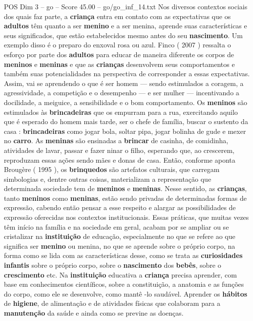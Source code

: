\begin{textsample}{POS Dim 3 – go – Score 45.00 – go/go\_inf\_14.txt}
Nos diversos contextos sociais dos quais faz parte, a \textbf{criança} entra em contato com as expectativas que os \textbf{adultos} têm quanto a ser \textbf{menino} e a ser menina, aprende suas características e seus significados, que estão estabelecidos mesmo antes do seu \textbf{nascimento}.
Um exemplo disso é o preparo do enxoval rosa ou azul.
Finco ( 2007 ) ressalta o esforço por parte dos \textbf{adultos} para educar de maneira diferente os corpos de \textbf{meninos} e \textbf{meninas} e que as \textbf{crianças} desenvolvem seus comportamentos e também suas potencialidades na perspectiva de corresponder a essas expectativas.
Assim, vai se aprendendo o que é ser homem — sendo estimulados a coragem, a agressividade, a competição e o desempenho — e ser mulher — incentivando a docilidade, a meiguice, a sensibilidade e o bom comportamento.
Os \textbf{meninos} são estimulados às \textbf{brincadeiras} que os empurram para a rua, exercitando aquilo que é esperado do homem mais tarde, ser o chefe de família, buscar o sustento da casa : \textbf{brincadeiras} como jogar bola, soltar pipa, jogar bolinha de gude e mexer no \textbf{carro}.
As \textbf{meninas} são ensinadas a \textbf{brincar} de casinha, de comidinha, atividades de lavar, passar e fazer ninar o filho, esperando que, ao crescerem, reproduzam essas ações sendo mães e donas de casa.
Então, conforme aponta Brougère ( 1995 ), os \textbf{brinquedos} são artefatos culturais, que carregam simbologias e, dentre outras coisas, materializam a representação que determinada sociedade tem de \textbf{meninos} e \textbf{meninas}.
Nesse sentido, as \textbf{crianças}, tanto \textbf{meninos} como \textbf{meninas}, estão sendo privadas de determinadas formas de expressão, cabendo então pensar a esse respeito e alargar as possibilidades de expressão oferecidas nos contextos institucionais.
Essas práticas, que muitas vezes têm início na família e na sociedade em geral, acabam por se ampliar ou se cristalizar na \textbf{instituição} de educação, especialmente no que se refere ao que significa ser \textbf{menino} ou menina, no que se aprende sobre o próprio corpo, na forma como se lida com as características desse, como se trata as \textbf{curiosidades} \textbf{infantis} sobre o próprio corpo, sobre o \textbf{nascimento} dos \textbf{bebês}, sobre o \textbf{crescimento} etc.
Na \textbf{instituição} educativa a \textbf{criança} precisa aprender, com base em conhecimentos científicos, sobre a constituição, a anatomia e as funções do corpo, como ele se desenvolve, como mantê -lo saudável.
Aprender os \textbf{hábitos} de \textbf{higiene}, de alimentação e de atividades físicas que colaboram para a \textbf{manutenção} da saúde e ainda como se previne as doenças.

\end{textsample}
